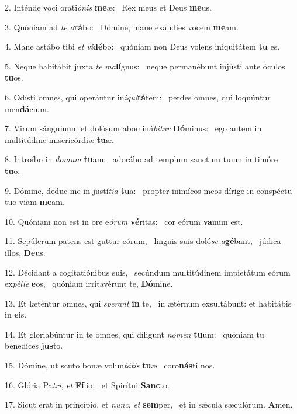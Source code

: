 2. Inténde voci orati\textit{ó}\textit{nis} \textbf{me}æ: \ast\  Rex meus et Deus \textbf{me}us.\

3. Quóniam ad \textit{te} \textit{o}\textbf{rá}bo: \ast\  Dómine, mane exáudies vocem \textbf{me}am.\

4. Mane astábo tibi \textit{et} \textit{vi}\textbf{dé}bo: \ast\  quóniam non Deus volens iniquitátem \textbf{tu} es.\

5. Neque habitábit juxta \textit{te} \textit{ma}\textbf{lí}gnus: \ast\  neque permanébunt injústi ante óculos \textbf{tu}os.\

6. Odísti omnes, qui operántur in\textit{i}\textit{qui}\textbf{tá}tem: \ast\  perdes omnes, qui loquúntur men\textbf{dá}cium.\

7. Virum sánguinum et dolósum abominá\textit{bi}\textit{tur} \textbf{Dó}minus: \ast\  ego autem in multitúdine misericórdiæ \textbf{tu}æ.\

8. Introíbo in \textit{do}\textit{mum} \textbf{tu}am: \ast\  adorábo ad templum sanctum tuum in timóre \textbf{tu}o.\

9. Dómine, deduc me in justí\textit{ti}\textit{a} \textbf{tu}a: \ast\  propter inimícos meos dírige in conspéctu tuo viam \textbf{me}am.\

10. Quóniam non est in ore e\textit{ó}\textit{rum} \textbf{vé}ritas: \ast\  cor eórum \textbf{va}num est.\

11. Sepúlcrum patens est guttur eórum, \dag\  linguis suis doló\textit{se} \textit{a}\textbf{gé}bant, \ast\  júdica illos, \textbf{De}us.\

12. Décidant a cogitatiónibus suis, \dag\  secúndum multitúdinem impietátum eórum ex\textit{pél}\textit{le} \textbf{e}os, \ast\  quóniam irritavérunt te, \textbf{Dó}mine.\

13. Et læténtur omnes, qui \textit{spe}\textit{rant} \textbf{in} te, \ast\  in ætérnum exsultábunt: et habitábis in \textbf{e}is.\

14. Et gloriabúntur in te omnes, qui díligunt \textit{no}\textit{men} \textbf{tu}um: \ast\  quóniam tu benedíces \textbf{jus}to.\

15. Dómine, ut scuto bonæ volun\textit{tá}\textit{tis} \textbf{tu}æ \ast\  coro\textbf{nás}ti nos.\

16. Glória Pa\textit{tri}, \textit{et} \textbf{Fí}lio, \ast\  et Spirítui \textbf{Sanc}to.\

17. Sicut erat in princípio, et \textit{nunc}, \textit{et} \textbf{sem}per, \ast\  et in sǽcula sæculórum. \textbf{A}men.\

